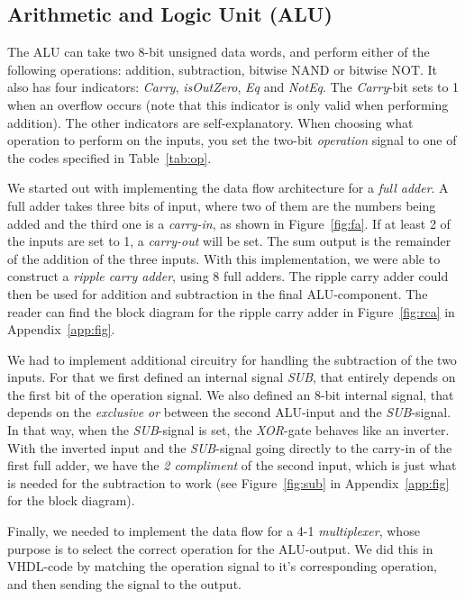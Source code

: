 \documentclass[a4,11pt]{article}
\begin{document}
\subsection{Arithmetic and Logic Unit (ALU)}

The ALU can take two 8-bit unsigned data words, and perform either of the following operations:
addition, subtraction, bitwise NAND or bitwise NOT. It also has four indicators: {\it Carry},
{\it isOutZero}, {\it Eq} and {\it NotEq}. The {\it Carry}-bit sets to 1 when an overflow occurs
(note that this indicator is only valid when performing addition). The other indicators are
self-explanatory. When choosing what operation to perform on the inputs, you set the two-bit
{\it operation} signal to one of the codes specified in Table~\ref{tab:op}.

We started out with implementing the data flow architecture for a {\it full adder}. A full adder
takes three bits of input, where two of them are the numbers being added and the third one is a
{\it carry-in}, as shown in Figure~\ref{fig:fa}. If at least 2 of the inputs are set to 1, a
{\it carry-out} will be set. The sum output is the remainder of the addition of the three inputs.
With this implementation, we were able to construct a {\it ripple carry adder}, using 8 full adders.
The ripple carry adder could then be used for addition and subtraction in the final ALU-component.
The reader can find the block diagram for the ripple carry adder in Figure~\ref{fig:rca} in
Appendix~\ref{app:fig}.

We had to implement additional circuitry for handling the subtraction of the two inputs. For
that we first defined an internal signal {\it SUB}, that entirely depends on the first bit of the
operation signal. We also defined an 8-bit internal signal, that depends on the {\it exclusive
or} between the second ALU-input and the {\it SUB}-signal. In that way, when the {\it SUB}-signal
is set, the {\it XOR}-gate behaves like an inverter. With the inverted input and the {\it SUB}-signal
going directly to the carry-in of the first full adder, we have the {\it 2 compliment} of the second
input, which is just what is needed for the subtraction to work (see Figure~\ref{fig:sub} in
Appendix~\ref{app:fig} for the block diagram).

Finally, we needed to implement the data flow for a 4-1 {\it multiplexer}, whose purpose is to
select the correct operation for the ALU-output. We did this in VHDL-code by matching the operation
signal to it's corresponding operation, and then sending the signal to the output.
\end{document}
